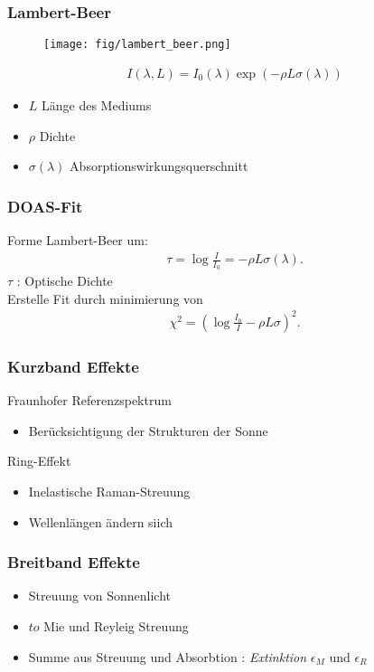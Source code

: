 \documentclass{beamer}
\begin{document}
\begin{frame}
    \frametitle{Lambert-Beer}
    \begin{figure}[h]
        \texttt{[image: fig/lambert\_beer.png]}
    \end{figure}
\pause
    \begin{align}
    I(\lambda, L) = I_0 (\lambda) \exp (- \rho  L \sigma (\lambda) )
    \end{align}
    \begin{itemize}
        \item $L$ Länge des Mediums
        \item $\rho$ Dichte
        \item $\sigma (\lambda)$ Absorptionswirkungsquerschnitt
    \end{itemize}
\end{frame}


\begin{frame}
    \frametitle{DOAS-Fit}
    Forme Lambert-Beer um:
\begin{align}
    \tau = \log \frac{I}{I_0} = - \rho L \sigma (\lambda).
\end{align}
$\tau$ : Optische Dichte\\
Erstelle Fit durch minimierung von
    \begin{align}
        \chi^2 = ( \log \frac{I_0}{I} - \rho L \sigma )^2. 
    \end{align}
\end{frame}


\begin{frame}
    \frametitle{Kurzband Effekte}
Fraunhofer Referenzspektrum
    \begin{itemize}
        \item Berücksichtigung der Strukturen der Sonne
    \end{itemize}
    Ring-Effekt
    \begin{itemize}
        \item Inelastische Raman-Streuung
        \item Wellenlängen ändern siich
    \end{itemize}
\end{frame}

\begin{frame}
    \frametitle{Breitband Effekte}
    \begin{itemize}
        \item Streuung von Sonnenlicht 
        \item $to$ Mie und Reyleig Streuung
        \item Summe aus Streuung und Absorbtion : \textit{Extinktion} $\epsilon_M$ und $\epsilon_R$
    \end{itemize}
\end{frame}
\end{document}
